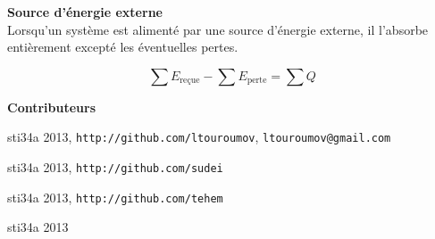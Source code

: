 \documentclass[12pt,a4paper]{article} %
\begin{document}
{\bfseries Source d'énergie externe} \\
Lorsqu'un système est alimenté par une source d'énergie externe, il l'absorbe entièrement excepté les éventuelles pertes.

\[\sum E_\text{reçue} - \sum E_\text{perte} = \sum Q\]

\newpage

\tableofcontents
\vspace{2em}
{\large\bfseries Contributeurs} \\
\begin{description}[style=nextline]
	\item[Jeremy David] sti34a 2013, \texttt{http://github.com/ltouroumov}, \texttt{ltouroumov@gmail.com}
	\item[Kevin Wenger] sti34a 2013, \texttt{http://github.com/sudei}
	\item[Timothée Moulin] sti34a 2013, \texttt{http://github.com/tehem}
	\item[Vincent Kobel] sti34a 2013
\end{description}

\end{document}
